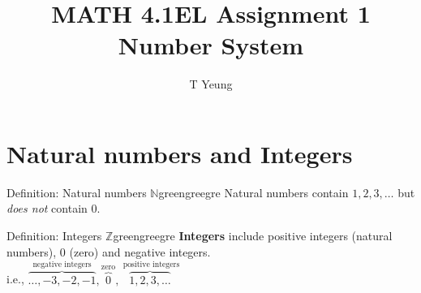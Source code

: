 \documentclass[addpoints, 10pt]{exam}
\date{}
\title{MATH 4.1EL Assignment 1 \\ Number System}
\author{T Yeung}
\newenvironment{defin}[1]{\begin{mycolorbox}{Definition: #1}{green}{gree}{gre}}{\end{mycolorbox}}
\begin{document}
\maketitle

\begin{center}
\end{center}
\vspace{0.1in}
\vspace{0.2in}

\section{Natural numbers and Integers}

	\begin{defin}{Natural numbers $\mathbb{N}$}
		Natural numbers contain $1,2,3, \ldots$ but \emph{does not} contain $0$.
	\end{defin}	

	\begin{defin}{Integers $\mathbb{Z}$}
		\textbf{Integers} include positive integers (natural numbers), 0 (zero) and negative integers. \\
		i.e., $\overbrace{\ldots,-3,-2,-1}^{\text{negative integers}}, \overbrace{0}^{\text{zero}}, \overbrace{1, 2, 3,\ldots}^{\text{ positive integers} }$
	\end{defin}	
\end{document}

